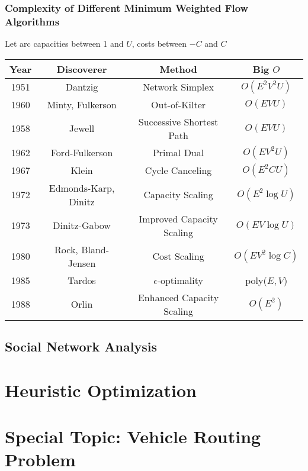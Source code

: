 			\section{Complexity of Different Minimum Weighted Flow Algorithms}
				Let arc capacities between 1 and $U$, costs between $-C$ and $C$
				\begin{table*}[ht]
					\centering
					\begin{tabular} {|c|c|c|c|}
						\hline
						Year & Discoverer & Method & Big $O$ \\
						\hline
						1951 & Dantzig & Network Simplex & $O(E^2V^2U)$ \\
						1960 & Minty, Fulkerson & Out-of-Kilter & $O(EVU)$\\
						1958 & Jewell & Successive Shortest Path & $O(EVU)$ \\
						1962 & Ford-Fulkerson & Primal Dual & $O(EV^2U)$ \\
						1967 & Klein & Cycle Canceling & $O(E^2CU)$ \\
						1972 & Edmonds-Karp, Dinitz & Capacity Scaling & $O(E^2 \log U)$\\
						1973 & Dinitz-Gabow & Improved Capacity Scaling & $O(EV\log U)$ \\
						1980 & Rock, Bland-Jensen & Cost Scaling & $O(EV^2\log C)$\\
						1985 & Tardos & $\epsilon$-optimality & poly($E,V$)\\
						1988 & Orlin & Enhanced Capacity Scaling & $O(E^2)$ \\
						\hline
					\end{tabular}
				\end{table*}

		\chapter{Social Network Analysis}

	\part{Heuristic Optimization}\label{Heur}
		\chapter{}

	\part*{Special Topic: Vehicle Routing Problem}\label{VRP}
